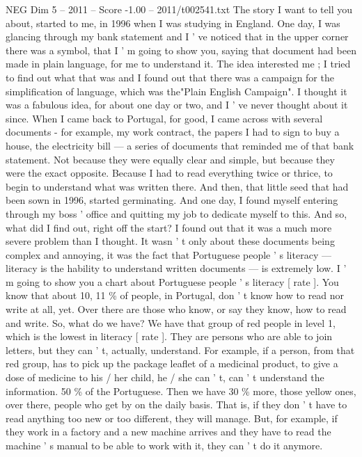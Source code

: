 \begin{textsample}{NEG Dim 5 – 2011 – Score -1.00 – 2011/t002541.txt}  \label{ex:f5_neg_049}
The story I want to tell you about, started to me, in 1996 when I was studying in England.
One day, I was glancing through my bank statement and I ' ve noticed that in the upper corner there was a symbol, that I ' m going to show you, saying that document had been made in plain language, for me to understand it.
The idea interested me ; I tried to find out what that was and I found out that there was a campaign for the simplification of language, which was the"Plain English Campaign".
I thought it was a fabulous idea, for about one day or two, and I ' ve never thought about it since.
When I came back to Portugal, for good, I came across with several documents - for example, my work contract, the papers I had to sign to buy a house, the electricity bill — a series of documents that reminded me of that bank statement.
Not because they were equally clear and simple, but because they were the exact opposite.
Because I had to read everything twice or thrice, to begin to understand what was written there.
And then, that little seed that had been sown in 1996, started germinating.
And one day, I found myself entering through my boss ' office and quitting my job to dedicate myself to this.
And so, what did I find out, right off the start?
I found out that it was a much more severe problem than I thought.
It wasn ' t only about these documents being complex and annoying, it was the fact that Portuguese people ' s literacy — literacy is the hability to understand written documents — is extremely low.
I ' m going to show you a chart about Portuguese people ' s literacy [ rate ].
You know that about 10, 11 \% of people, in Portugal, don ' t know how to read nor write at all, yet.
Over there are those who know, or say they know, how to read and write.
So, what do we have?
We have that group of red people in level 1, which is the lowest in literacy [ rate ].
They are persons who are able to join letters, but they can ' t, actually, understand.
For example, if a person, from that red group, has to pick up the package leaflet of a medicinal product, to give a dose of medicine to his / her child, he / she can ' t, can ' t understand the information. 50 \% of the Portuguese.
Then we have 30 \% more, those yellow ones, over there, people who get by on the daily basis.
That is, if they don ' t have to read anything too new or too different, they will manage.
But, for example, if they work in a factory and a new machine arrives and they have to read the machine ' s manual to be able to work with it, they can ' t do it anymore.

\end{textsample}
